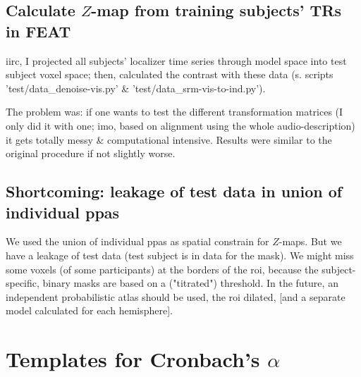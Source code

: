 \subsection{Calculate $Z$-map from training subjects' TRs in FEAT}

iirc, I projected all subjects' localizer time series through
model space into test subject voxel space; then, calculated the contrast
with these data (s. scripts 'test/data\_denoise-vis.py' \&
'test/data\_srm-vis-to-ind.py').
%

The problem was: if one wants to test the different transformation matrices (I
only did it with one; imo, based on alignment using the whole audio-description)
it gets totally messy \& computational intensive.
%
Results were similar to the original procedure if not slightly worse.



\subsection{Shortcoming: leakage of test data in union of individual
\acp{ppa}}

%
We used the union of individual \acp{ppa} as spatial constrain for $Z$-maps.
%
But we have a leakage of test data (test subject is in data for the mask).
%
We might miss some voxels (of some participants) at the borders of the \ac{roi},
because the subject-specific, binary masks are based on a ("titrated")
threshold.  \citep{sengupta2016extension}
%
In the future, an independent probabilistic atlas should be used, the \ac{roi}
dilated, [and a separate model calculated for each hemisphere].



\pagebreak

\section{Templates for Cronbach's $\alpha$}


